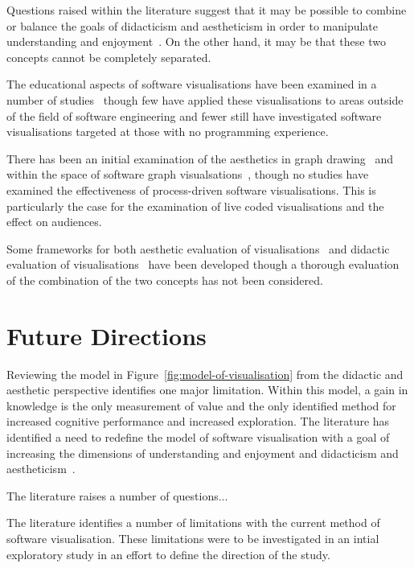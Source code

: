 Questions raised within the literature suggest that it may be possible to combine or balance the goals of didacticism and aestheticism in order to manipulate understanding and enjoyment~. On the other hand, it may be that these two concepts cannot be completely separated.

The educational aspects of software visualisations have been examined in a number of studies~ though few have applied these visualisations to areas outside of the field of software engineering and fewer still have investigated software visualisations targeted at those with no programming experience.

There has been an initial examination of the aesthetics in graph drawing~ and within the space of software graph visualsations~, though no studies have examined the effectiveness of process-driven software visualisations. This is particularly the case for the examination of live coded visualisations and the effect on audiences.

Some frameworks for both aesthetic evaluation of visualisations~\cite{Cawthon2007,Purchase1996} and didactic evaluation of visualisations~\cite{VanWijk2005} have been developed though a thorough evaluation of the combination of the two concepts has not been considered.

\section{Future Directions}

Reviewing the model in Figure~\ref{fig:model-of-visualisation} from the didactic and aesthetic perspective identifies one major limitation. Within this model, a gain in knowledge is the only measurement of value and the only identified method for increased cognitive performance and increased exploration. The literature has identified a need to redefine the model of software visualisation with a goal of increasing the dimensions of understanding and enjoyment and didacticism and aestheticism~.

The literature raises a number of questions...

The literature identifies a number of limitations with the current method of software visualisation. These limitations were to be investigated in an intial exploratory study in an effort to define the direction of the study. 










